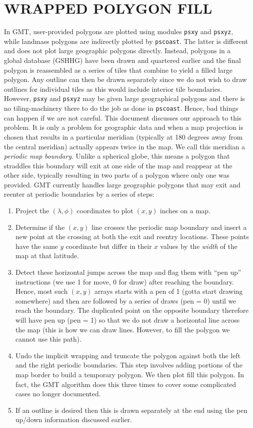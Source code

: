 \documentclass[12pt,letterpaper,margin=0.5in]{article}
\begin{document}
\section{WRAPPED POLYGON FILL}

In GMT, user-provided polygons are plotted using modules \texttt{psxy} and \texttt{psxyz}, while landmass polygons are indirectly plotted by \texttt{pscoast}.
The latter is different and does not plot large geographic polygons directly.  Instead, polygons in a global database (GSHHG) have been drawn and
quartered earlier and the final polygon is reassembled as a series of tiles that combine to yield a filled large
polygon.  Any outline can then be drawn separately since we do not wish to draw outlines for individual tiles as
this would include interior tile boundaries.  However, \texttt{psxy} and \texttt{psxyz} may be given large geographical
polygons and there is no tiling-machinery there to do the job as done in \texttt{pscoast}.  Hence, bad things
can happen if we are not careful.  This document discusses our approach to this problem.  It is only a problem
for geographic data and when a map projection is chosen that results in a particular meridian (typically at 180 degrees
away from the central meridian) actually appears twice in the map.  We call this meridian a \emph{periodic map boundary}.
Unlike a spherical globe, this means a polygon that straddles this boundary will exit at one side of the map and reappear
at the other side, typically resulting in two parts of a polygon where only one was provided.
GMT currently handles large geographic polygons that may exit and reenter at periodic boundaries by a series of steps:
\begin{enumerate}
	\item Project the $(\lambda, \phi)$ coordinates to plot $(x,y)$ inches on a map.
	\item Determine if the $(x,y)$ line crosses the periodic map boundary and insert a new point at the crossing at both the exit
		and reentry locations. These points have the same $y$ coordinate but differ in their $x$ values by the
		\emph{width} of the map at that latitude.
	\item Detect these horizontal jumps across the map and flag them with ``pen up'' instructions (we use 1 for move, 0 for draw)
		after reaching the boundary.  Hence, most such $(x,y)$ arrays starts with a pen of 1 (gotta start drawing somewhere)
		and then are followed by a series of draws (pen = 0) until we reach the boundary.  The duplicated point on the
		opposite boundary therefore will have pen up (pen = 1) so that we do not draw a horizontal line across the map (this
		is how we can draw lines. However, to fill the polygon we cannot use this path).
	\item Undo the implicit wrapping and truncate the polygon against both the left and the right periodic boundaries.
		This step involves adding portions of the map border to build a temporary polygon.  We then plot fill this polygon.
		In fact, the GMT algorithm does this three times to cover some complicated cases no longer documented.
	\item If an outline is desired then this is drawn separately at the end using the pen up/down information discussed earlier.
\end{enumerate}
\end{document}

